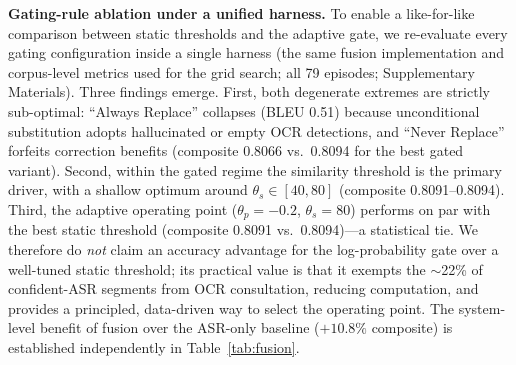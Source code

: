 \documentclass[mathematics,article,submit,xetex,moreauthors]{Definitions/mdpi}
\begin{document}
\begin{table}[H]
\centering
\caption{Adaptive multimodal fusion results. Composite score defined in Equation~\eqref{eq:composite}. Best results in bold.}
\label{tab:fusion}
\end{table}

\textbf{Gating-rule ablation under a unified harness.}
To enable a like-for-like comparison between static thresholds and the adaptive gate, we re-evaluate every gating configuration inside a single harness (the same fusion implementation and corpus-level metrics used for the grid search; all 79 episodes; Supplementary Materials).
Three findings emerge.
First, both degenerate extremes are strictly sub-optimal: ``Always Replace'' collapses (BLEU 0.51) because unconditional substitution adopts hallucinated or empty OCR detections, and ``Never Replace'' forfeits correction benefits (composite 0.8066 vs.\ 0.8094 for the best gated variant).
Second, within the gated regime the similarity threshold is the primary driver, with a shallow optimum around $\theta_s \in [40, 80]$ (composite 0.8091--0.8094).
Third, the adaptive operating point ($\theta_p{=}-0.2$, $\theta_s{=}80$) performs on par with the best static threshold (composite 0.8091 vs.\ 0.8094)---a statistical tie.
We therefore do \emph{not} claim an accuracy advantage for the log-probability gate over a well-tuned static threshold; its practical value is that it exempts the $\sim$22\% of confident-ASR segments from OCR consultation, reducing computation, and provides a principled, data-driven way to select the operating point.
The system-level benefit of fusion over the ASR-only baseline ($+10.8\%$ composite) is established independently in Table~\ref{tab:fusion}.
\end{document}
